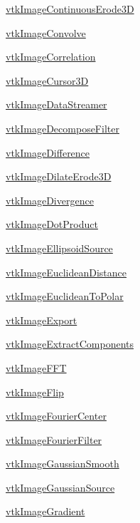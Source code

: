 \begin{DoxyItemize}
\item \hyperlink{vtkimaging_vtkimagecontinuouserode3d}{vtk\-Image\-Continuous\-Erode3\-D}  
\item \hyperlink{vtkimaging_vtkimageconvolve}{vtk\-Image\-Convolve}  
\item \hyperlink{vtkimaging_vtkimagecorrelation}{vtk\-Image\-Correlation}  
\item \hyperlink{vtkimaging_vtkimagecursor3d}{vtk\-Image\-Cursor3\-D}  
\item \hyperlink{vtkimaging_vtkimagedatastreamer}{vtk\-Image\-Data\-Streamer}  
\item \hyperlink{vtkimaging_vtkimagedecomposefilter}{vtk\-Image\-Decompose\-Filter}  
\item \hyperlink{vtkimaging_vtkimagedifference}{vtk\-Image\-Difference}  
\item \hyperlink{vtkimaging_vtkimagedilateerode3d}{vtk\-Image\-Dilate\-Erode3\-D}  
\item \hyperlink{vtkimaging_vtkimagedivergence}{vtk\-Image\-Divergence}  
\item \hyperlink{vtkimaging_vtkimagedotproduct}{vtk\-Image\-Dot\-Product}  
\item \hyperlink{vtkimaging_vtkimageellipsoidsource}{vtk\-Image\-Ellipsoid\-Source}  
\item \hyperlink{vtkimaging_vtkimageeuclideandistance}{vtk\-Image\-Euclidean\-Distance}  
\item \hyperlink{vtkimaging_vtkimageeuclideantopolar}{vtk\-Image\-Euclidean\-To\-Polar}  
\item \hyperlink{vtkimaging_vtkimageexport}{vtk\-Image\-Export}  
\item \hyperlink{vtkimaging_vtkimageextractcomponents}{vtk\-Image\-Extract\-Components}  
\item \hyperlink{vtkimaging_vtkimagefft}{vtk\-Image\-F\-F\-T}  
\item \hyperlink{vtkimaging_vtkimageflip}{vtk\-Image\-Flip}  
\item \hyperlink{vtkimaging_vtkimagefouriercenter}{vtk\-Image\-Fourier\-Center}  
\item \hyperlink{vtkimaging_vtkimagefourierfilter}{vtk\-Image\-Fourier\-Filter}  
\item \hyperlink{vtkimaging_vtkimagegaussiansmooth}{vtk\-Image\-Gaussian\-Smooth}  
\item \hyperlink{vtkimaging_vtkimagegaussiansource}{vtk\-Image\-Gaussian\-Source}  
\item \hyperlink{vtkimaging_vtkimagegradient}{vtk\-Image\-Gradient}  

\end{DoxyItemize}
